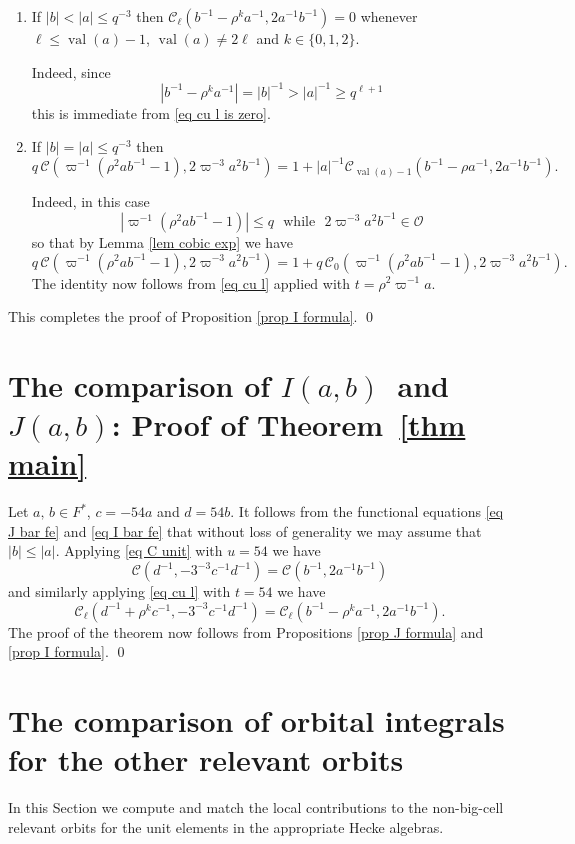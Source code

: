 \documentclass[12pt]{amsart}
\newcommand{\abs}[1]{\left|{#1}\right|}
\renewcommand{\O}{\mathcal{O}}
\newcommand{\val}{{\operatorname{val}}}
\newcommand{\Cu}{\mathcal{C}}
\theoremstyle{remark}
\begin{document}
\begin{enumerate}
Indeed, since $\max(\abs{2\varpi^{-3}a^2b^{-1}},q)<\abs{\varpi^{-1}(\rho^2ab^{-1}-1)}$ this is immediate from Lemma \ref{lem cobic exp}.

\item If $\abs{b}<\abs{a}\le q^{-3}$ then $\Cu_\ell(b^{-1}-\rho^k a^{-1},2a^{-1}b^{-1})=0$ whenever $\ell\le \val(a)-1$, $\val(a)\not=2\ell$ and $k\in\{0,1,2\}$. 

Indeed, since 
\[
\abs{b^{-1}-\rho^k a^{-1}}=\abs{b}^{-1}>\abs{a}^{-1}\ge q^{\ell+1}
\]
this is immediate from \eqref{eq cu l is zero}.
\item
If $\abs{b}=\abs{a}\le q^{-3}$ then 
\[
q\,\Cu(\varpi^{-1}(\rho^2ab^{-1}-1),2\varpi^{-3}a^2b^{-1})=1+\abs{a}^{-1}\Cu_{\val(a)-1}(b^{-1}-\rho a^{-1}, 2a^{-1}b^{-1}). 
\]

Indeed, in this case 
\[
\abs{\varpi^{-1}(\rho^2ab^{-1}-1)}\le q \ \ \ \text{while}\ \ \ 2\varpi^{-3}a^2b^{-1}\in \O
\] 
so that by Lemma \ref{lem cobic exp} we have
\[
q\,\Cu(\varpi^{-1}(\rho^2ab^{-1}-1),2\varpi^{-3}a^2b^{-1})=1+q\,\Cu_0(\varpi^{-1}(\rho^2ab^{-1}-1),2\varpi^{-3}a^2b^{-1}).
\]
The identity now follows from \eqref{eq cu l} applied with $t=\rho^2\varpi^{-1}a$.
\end{enumerate}

This completes the proof of Proposition \ref{prop I formula}. \qed



\section{The comparison of \texorpdfstring{$I(a,b)$}{}~and \texorpdfstring{$J(a,b)$}{}: Proof of Theorem~\ref{thm main}}\label{The-big-cell-comparison-is-done}
Let $a,\,b\in F^*$, $c=-54a$ and $d=54b$. It follows from the functional equations \eqref{eq J bar fe} and \eqref{eq I bar fe} that without loss of generality we may assume that $\abs{b}\le \abs{a}$. Applying \eqref{eq C unit} with $u=54$ we have 
\[
\Cu(d^{-1},-3^{-3}c^{-1}d^{-1})=\Cu(b^{-1},2a^{-1}b^{-1})
\]
and similarly applying \eqref{eq cu l} with  $t=54$ we have
\[
\Cu_\ell(d^{-1}+\rho^k c^{-1},-3^{-3}c^{-1}d^{-1})=\Cu_\ell(b^{-1}-\rho^k a^{-1},2a^{-1}b^{-1}).
\]
The proof of the theorem now follows from Propositions \ref{prop J formula} and \ref{prop I formula}. \qed

\section{The comparison of orbital integrals for the other relevant orbits}\label{Comparison for smaller cells}
In this Section we compute and match the local contributions to the non-big-cell relevant orbits for the unit elements in the appropriate Hecke algebras.
\end{document}
